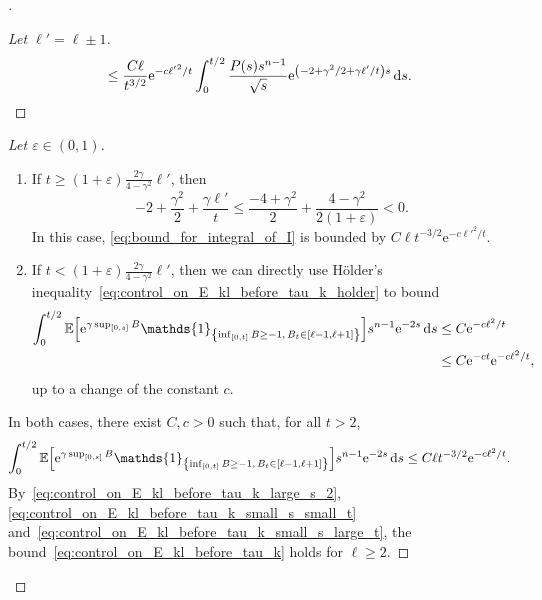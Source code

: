 \documentclass[10pt]{amsart}
\theoremstyle{definition}\newtheorem{defi}[theo]{Definition}\newtheorem{rema}[theo]{Remark}\newtheorem{exam}[theo]{Example}\newtheorem{exem}[theo]{Example}\newtheorem{nota}[theo]{Notation}
\newcommand{\e}{\mathrm{e}}
\renewcommand{\d}[1]{\mathop{}\!\mathrm{d}#1}
\newcommand{\E}{\mathbb{E}}
\newcommand\1{\mathds{1}}
\newcommand*{\relabel}{\renewcommand{\labelenumi}{(\theenumi)}}
\newcommand*{\romanenumi}{\renewcommand*{\theenumi}{\roman{enumi}}\relabel}
\let\originalleft\left
\let\originalright\right
\renewcommand{\left}{\mathopen{}\mathclose\bgroup\originalleft}
\renewcommand{\right}{\aftergroup\egroup\originalright}
\newenvironment{proofc}[1][\proofname]{\begin{proof}[#1]}{\end{proof}}
\begin{document}
\begin{proofc}
\begin{proof}[{Let $\ell' = \ell \pm 1$}]
\begin{multline}
\leq \frac{C \ell}{t^{3/2}} \e^{-c {\ell'}^2/t} \int_0^{t/2} \frac{P(s) s^{n - 1}}{\sqrt{s}} \e^{\left(-2 + \gamma^2/2 + \gamma \ell'/t\right)s} \d{s}.
\end{multline}
\let\qed\relax
\end{proof}
\begin{proofc}[{Let $\varepsilon \in (0, 1)$}]
\begin{enumerate}\romanenumi
\item If $t \geq (1 + \varepsilon) \frac{2 \gamma}{4 - \gamma^2} \ell'$, then
\begin{equation*}
-2 + \frac{\gamma^2}{2} + \frac{\gamma \ell'}{t} \leq\frac{-4 + \gamma^2}{2} + \frac{4 - \gamma^2}{2 (1 + \varepsilon)} < 0.
\end{equation*}
In this case, \eqref{eq:bound_for_integral_of_I} is bounded by $C \ell t^{-3/2} \e^{-c {\ell'}^2/t}$.
\item If $t < (1 + \varepsilon) \frac{2 \gamma}{4 - \gamma^2} \ell'$, then we can directly use H\"older's inequality~\eqref{eq:control_on_E_kl_before_tau_k_holder} to bound
\begin{align*}
\int_0^{t/2} \E \left[\e^{\gamma \sup_{[0, s]} B} \1_{\left\{\inf_{[0, t]} B \geq -1,\, B_t \in [\ell-1, \ell+1]\right\}} \right] s^{n-1} \e^{-2s} \d{s} & \leq C \e^{-c\ell^2/t} \\
& \leq C \e^{-ct} \e^{-c\ell^2/t},
\end{align*}
up to a change of the constant $c$.
\end{enumerate}
In both cases, there exist $C, c > 0$ such that, for all $t > 2$,
\begin{equation}\label{eq:control_on_E_kl_before_tau_k_small_s_large_t}
\int_0^{t/2} \E \left[\e^{\gamma \sup_{[0, s]} B} \1_{\left\{\inf_{[0, t]} B \geq -1,\, B_t \in [\ell-1, \ell+1]\right\}} \right] s^{n-1} \e^{-2s} \d{s} \leq C \ell t^{-3/2} \e^{-c\ell^2/t}.
\end{equation}
By~\eqref{eq:control_on_E_kl_before_tau_k_large_s_2}, \eqref{eq:control_on_E_kl_before_tau_k_small_s_small_t} and~\eqref{eq:control_on_E_kl_before_tau_k_small_s_large_t}, the bound~\eqref{eq:control_on_E_kl_before_tau_k} holds for $\ell \geq 2$.\qedhere
\end{proofc}\let\qed\relax
\end{proofc}
\end{document}
